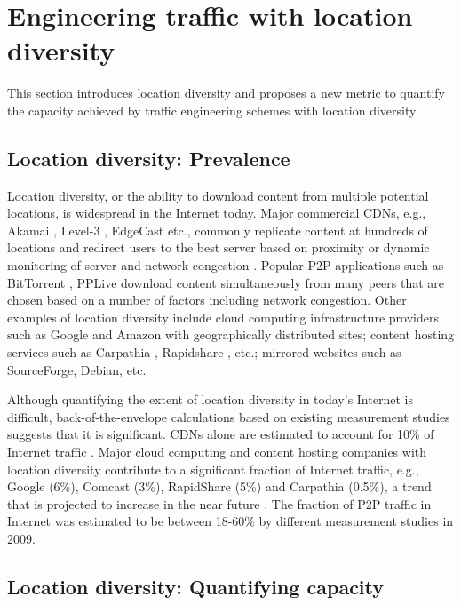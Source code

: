 \section{Engineering traffic with location diversity}
\label{sec:locdiv-background}

This section introduces location diversity and proposes a new metric to quantify the capacity achieved by traffic engineering schemes with location diversity.


\subsection{Location diversity: Prevalence}

Location diversity, or the ability to download content from multiple potential locations, is widespread in the Internet today. Major commercial CDNs, e.g., Akamai \cite{Akamai}, Level-3 \cite{Level-3}, EdgeCast \cite{edgecast} etc., commonly replicate content at hundreds of locations and redirect users to the best server based on proximity or dynamic monitoring of server and network congestion \cite{akamai-detour}. Popular P2P applications such as BitTorrent \cite{bittorrentprotocol}, PPLive \cite{PPLive} download content simultaneously from many peers that are chosen based on a number of factors including network congestion. Other examples of location diversity include cloud computing infrastructure providers such as Google and Amazon with geographically distributed sites; content hosting services such as Carpathia \cite{Carpathia}, Rapidshare \cite{OneClickHosting}, etc.; mirrored websites such as SourceForge, Debian, etc. 


Although quantifying the extent of location diversity in today's Internet is difficult, back-of-the-envelope calculations based on existing measurement studies suggests that it is significant.  CDNs alone are estimated to account for 10\% of Internet traffic \cite{AtlasReport}. Major cloud computing and content hosting companies with location diversity contribute to a significant fraction of Internet traffic, e.g., Google (6\%), Comcast (3\%), RapidShare (5\%) and Carpathia (0.5\%), a trend that is projected to increase in the near future \cite{urlinternet,AtlasReport}. The fraction of P2P traffic in Internet was estimated to be between 18-60\% by different measurement studies in 2009.  


\subsection{Location diversity: Quantifying capacity}

